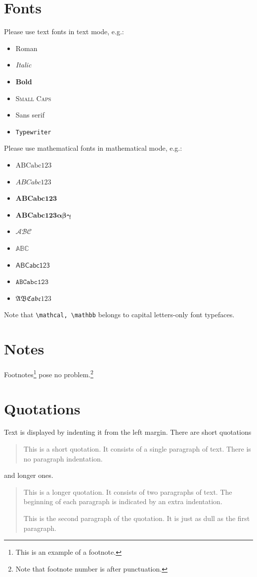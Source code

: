 \documentclass[ejsv2]{imsart}
\theoremstyle{plain}
\theoremstyle{definition}
\theoremstyle{remark}
\begin{document}
\section{Fonts}
Please use text fonts in text mode, e.g.:
\begin{itemize}
\item[]\textrm{Roman}
\item[]\textit{Italic}
\item[]\textbf{Bold}
\item[]\textsc{Small Caps}
\item[]\textsf{Sans serif}
\item[]\texttt{Typewriter}
\end{itemize}
Please use mathematical fonts in mathematical mode, e.g.:
\begin{itemize}
\item[] $\mathrm{ABCabc123}$
\item[] $\mathit{ABCabc123}$
\item[] $\mathbf{ABCabc123}$
\item[] $\boldsymbol{ABCabc123\alpha\beta\gamma}$
\item[] $\mathcal{ABC}$
\item[] $\mathbb{ABC}$
\item[] $\mathsf{ABCabc123}$
\item[] $\mathtt{ABCabc123}$
\item[] $\mathfrak{ABCabc123}$
\end{itemize}
Note that \verb|\mathcal, \mathbb| belongs to capital letters-only font typefaces.

\section{Notes}
Footnotes\footnote{This is an example of a footnote.}
pose no problem.\footnote{Note that footnote number is after punctuation.}

\section{Quotations}

Text is displayed by indenting it from the left margin. There are short quotations
\begin{quote}
This is a short quotation.  It consists of a
single paragraph of text.  There is no paragraph
indentation.
\end{quote}
and longer ones.
\begin{quotation}
This is a longer quotation.  It consists of two paragraphs
of text.  The beginning of each paragraph is indicated
by an extra indentation.

This is the second paragraph of the quotation.  It is just
as dull as the first paragraph.
\end{quotation}
\end{document}
